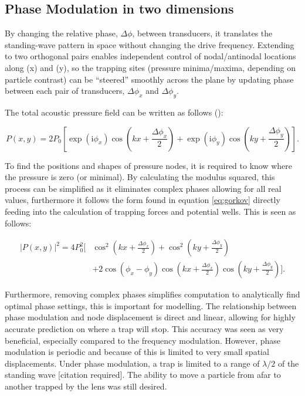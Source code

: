 \documentclass[11pt,a4paper]{article}
\begin{document}
\subsection{Phase Modulation in two dimensions}
\label{Phase Modulation}
By changing the relative phase, $\Delta\phi$, between transducers, it translates the standing-wave pattern in space without changing the drive frequency. Extending to two orthogonal pairs enables independent control of nodal/antinodal locations along (x) and (y), so the trapping sites (pressure minima/maxima, depending on particle contrast) can be “steered” smoothly across the plane by updating phase between each pair of transducers, $\Delta\phi_x$ and $\Delta\phi_y$.

The total acoustic pressure field can be written as follows (\cite{Courtney2012ManipulationWaves}):

\begin{equation}
    P(x, y) = 2P_0 \left[ \exp(\mathrm{i}\phi_x) \cos\left(kx + \frac{\Delta\phi_x}{2}\right) + \exp(\mathrm{i}\phi_y) \cos\left(ky + \frac{\Delta\phi_y}{2}\right) \right]. 
\label{eq:total_f_phase}
\end{equation}

To find the positions and shapes of pressure nodes, it is required to know where the pressure is zero (or minimal). By calculating the modulus squared, this process can be simplified as it eliminates complex phases allowing for all real values, furthermore it follows the form found in equation \ref{eq:gorkov} directly feeding into the calculation of trapping forces and potential wells. This is seen as follows:

\begin{equation}
\begin{aligned}
    |P(x, y)|^2 = 4P_0^2 \Bigg[ &\cos^2\left(kx + \frac{\Delta\phi_x}{2}\right) 
    + \cos^2\left(ky + \frac{\Delta\phi_y}{2}\right) \\
    &+ 2\cos(\phi_x - \phi_y) \cos\left(kx + \frac{\Delta\phi_x}{2}\right) 
    \cos\left(ky + \frac{\Delta\phi_y}{2}\right) \Bigg].
\end{aligned}
\label{eq:real_phase}
\end{equation}

Furthermore, removing complex phases simplifies computation to analytically find optimal phase settings, this is important for modelling. The relationship between phase modulation and node displacement is direct and linear, allowing for highly accurate prediction on where a trap will stop. This accuracy was seen as very beneficial, especially compared to the frequency modulation. However, phase modulation is periodic and because of this is limited to very small spatial displacements. Under phase modulation, a trap is limited to a range of $\lambda/2$ of the standing wave [citation required]. The ability to move a particle from afar to another trapped by the lens was still desired.
\end{document}
